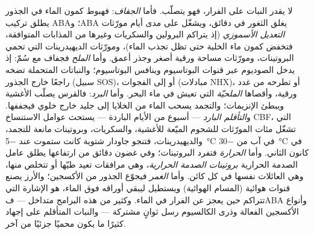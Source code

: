 \begin{definition}\label{def:b3:plant-molecular-physiology:abiotic}
لا يقدر النبات على الفرار، فهو يتصلّب. فأما \emph{الجفاف}:
فهبوط كمون الماء في الجذور يطلق تركيب ABA؛ وABA يغلق الثغور
في دقائق، ويشغّل على مدى أيام مورّثات \emph{التعديل الأسموزي}
(إذ يتراكم البرولين والسكريات وغيرها من المذابات المتوافقة،
فتخفض كمون ماء الخلية حتى تظل تجذب الماء)، ومورّثات
الديهيدرينات التي تحمي البروتينات، ومورّثات مساحة ورقية أصغر
وجذر أعمق. وأما \emph{الملح} فجفاف مع سُمّ: إذ يدخل الصوديوم
عبر قنوات البوتاسيوم وينافس البوتاسيوم؛ والنباتات المتحملة
تضخه راجعًا خارج الجذور (سبيل SOS)، أو إلى الفجوات (مبادلات
NHX)، أو تطرحه من غدد ورقية، وأقصاها \emph{الملحيّة} التي
تعيش في ماء البحر. وأما \emph{البرد}: فالقرس يصلّب الأغشية
ويبطئ الإنزيمات؛ والتجمد يسحب الماء من الخلايا إلى جليد خارج
خلوي فيجففها. و\emph{التأقلم البارد} --- أسبوع من الأيام
الباردة --- يستحث عوامل الاستنساخ CBF، التي تشغّل مئات
المورّثات للشحوم الميّعة للأغشية، والسكريات، وبروتينات مانعة
للتجمد، والديهيدرينات، فتنجو جاودار شتوية كانت ستموت عند
\qty{-5}{\celsius} في آب من \qty{-30}{\celsius} في كانون
الثاني. وأما \emph{الحرارة} فتفرد البروتينات؛ وفي غضون دقائق
من ارتفاعها يطلق عامل الصدمة الحرارية \emph{بروتينات الصدمة
الحرارية}، وهي مرافقات تعيد طيّها أو تتخلص منها، وهي العائلات
نفسها في كل كائن. وأما \emph{الغمر} فيجوّع الجذور من
الأكسجين؛ والأرز يصنع قنوات هوائية (المسام الهوائية) ويستطيل
ليبقي أوراقه فوق الماء،  هو الإشارة التي تتراكم
حين يعجز عن الفرار في الماء. وكثير من هذه البرامج متداخل ---
فABA وأنواع الأكسجين الفعالة وذرى الكالسيوم رسل ثوانٍ
مشتركة --- والنبات المتأقلم على إجهاد كثيرًا ما يكون محميًا
جزئيًا من آخر.
\end{definition}

